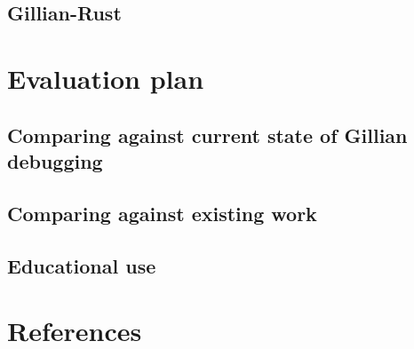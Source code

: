 \documentclass[a4paper, twoside]{report}
\begin{document}
\section{Gillian-Rust}

\chapter{Evaluation plan}
\section{Comparing against current state of Gillian debugging}
\section{Comparing against existing work}
\section{Educational use}



\chapter{References}


\end{document}

